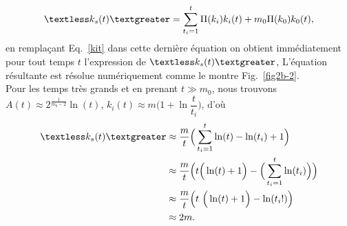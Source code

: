 \begin{eqnarray}
\kms=\sum_{t_i=1}^t\Pi(k_i)k_i(t)+m_0\Pi(k_0)k_0(t),
\label{kms-2}
\end{eqnarray}
 en remplaçant Eq.~\eqref{kit} dans cette dernière équation on obtient immédiatement pour tout temps $ t $ l'expression de $\kms$, L'équation résultante est résolue numériquement comme le montre Fig.~\ref{fig2b-2}. \\
Pour les temps très grands et en prenant $t \gg m_0$, nous trouvons 
$A(t)\approx 2^{\frac{1}{m_0-2}} \ln(t)$, $k_i(t)\approx m\Big(1+\ln \dfrac{t}{t_i}\Big)$, d'où
\begin{align}
\label{kom}
\kms&\approx\dfrac{m}{t}\Big(\sum_{t_i=1}^{t} \ln(t)-\ln(t_i)+1\Big)\\
&\approx\dfrac{m}{t}\Big(t \Big(\ln(t)+1\Big)-\Big(\sum_{t_i=1}^{t} \ln(t_i)\Big)\Big) \nonumber \\
&\approx\dfrac{m}{t}\Big(t\ \Big(\ln(t)+1\Big)-\ln(t_i!)\Big) \nonumber \\
&\approx2m. \nonumber
\end{align}

